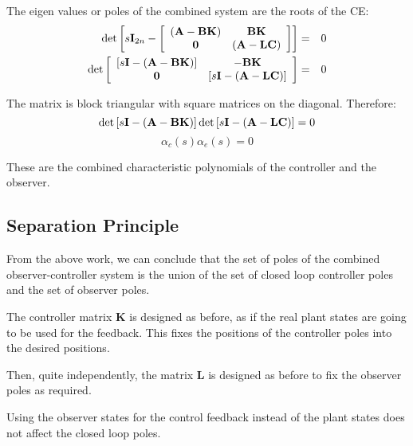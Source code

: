 The eigen values or poles of the combined system are the roots of the CE:
\begin{eqnarray*}
	\det \left[ {s{\bf{I}}_{2n}  - \left[ {\begin{array}{*{20}c}
	   {\left( {{\bf{A}} - {\bf{BK}}} \right)} & {{\bf{BK}}}  \\
	   {\bf{0}} & {\left( {{\bf{A}} - {\bf{LC}}} \right)}  \\
	\end{array}} \right]} \right] & = &  0 \\
	\det \left[ {\begin{array}{*{20}c}
	   {\left[ {s{\bf{I}} - \left( {{\bf{A}} - {\bf{BK}}} \right)} \right]} & { - {\bf{BK}}}  \\
	   {\bf{0}} & {\left[ {s{\bf{I}} - \left( {{\bf{A}} - {\bf{LC}}} \right)} \right]}  \\
	\end{array}} \right] & = & 0
\end{eqnarray*}
 
The matrix is block triangular with square matrices on the diagonal. Therefore:
\[
	\det \left[ {s{\bf{I}} - \left( {{\bf{A}} - {\bf{BK}}} \right)} \right]\det\left[ {s{\bf{I}} - \left( {{\bf{A}} - {\bf{LC}}} \right)} \right] = 0 
\]
\[
	\alpha_c(s)\alpha_e(s) = 0 
\]
 

These are the combined characteristic polynomials of the controller and the observer.





\subsection*{Separation Principle} %
\label{sub:separation_principle}

From the above work, we can conclude that the set of poles of the combined observer-controller system is the union of the set of closed loop controller poles and the set of observer poles.

The controller matrix  $\mathbf{K}$  is designed as before, as if the real plant states are going to be used for the feedback. This fixes the positions of the controller poles into the desired positions.

Then, quite independently, the matrix $\mathbf{L}$ is designed as before to fix the observer poles as required.

Using the observer states for the control feedback instead of the plant states does not affect the closed loop poles.

